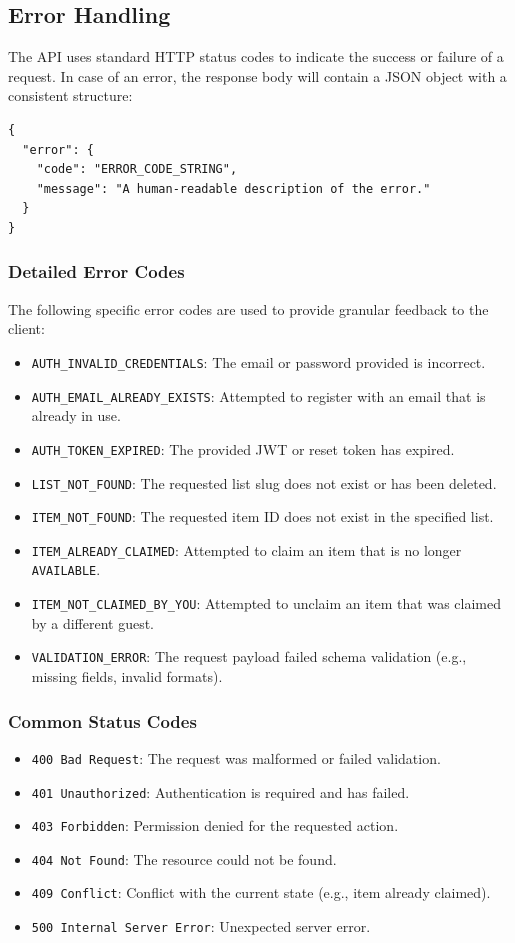 \subsection{Error Handling}
The API uses standard HTTP status codes to indicate the success or failure of a request. In case of an error, the response body will contain a JSON object with a consistent structure:
\begin{verbatim}
{
  "error": {
    "code": "ERROR_CODE_STRING",
    "message": "A human-readable description of the error."
  }
}
\end{verbatim}

\subsubsection{Detailed Error Codes}
The following specific error codes are used to provide granular feedback to the client:
\begin{itemize}
    \item \texttt{AUTH\_INVALID\_CREDENTIALS}: The email or password provided is incorrect.
    \item \texttt{AUTH\_EMAIL\_ALREADY\_EXISTS}: Attempted to register with an email that is already in use.
    \item \texttt{AUTH\_TOKEN\_EXPIRED}: The provided JWT or reset token has expired.
    \item \texttt{LIST\_NOT\_FOUND}: The requested list slug does not exist or has been deleted.
    \item \texttt{ITEM\_NOT\_FOUND}: The requested item ID does not exist in the specified list.
    \item \texttt{ITEM\_ALREADY\_CLAIMED}: Attempted to claim an item that is no longer \texttt{AVAILABLE}.
    \item \texttt{ITEM\_NOT\_CLAIMED\_BY\_YOU}: Attempted to unclaim an item that was claimed by a different guest.
    \item \texttt{VALIDATION\_ERROR}: The request payload failed schema validation (e.g., missing fields, invalid formats).
\end{itemize}

\subsubsection{Common Status Codes}
\begin{itemize}
    \item \texttt{400 Bad Request}: The request was malformed or failed validation.
    \item \texttt{401 Unauthorized}: Authentication is required and has failed.
    \item \texttt{403 Forbidden}: Permission denied for the requested action.
    \item \texttt{404 Not Found}: The resource could not be found.
    \item \texttt{409 Conflict}: Conflict with the current state (e.g., item already claimed).
    \item \texttt{500 Internal Server Error}: Unexpected server error.
\end{itemize}

